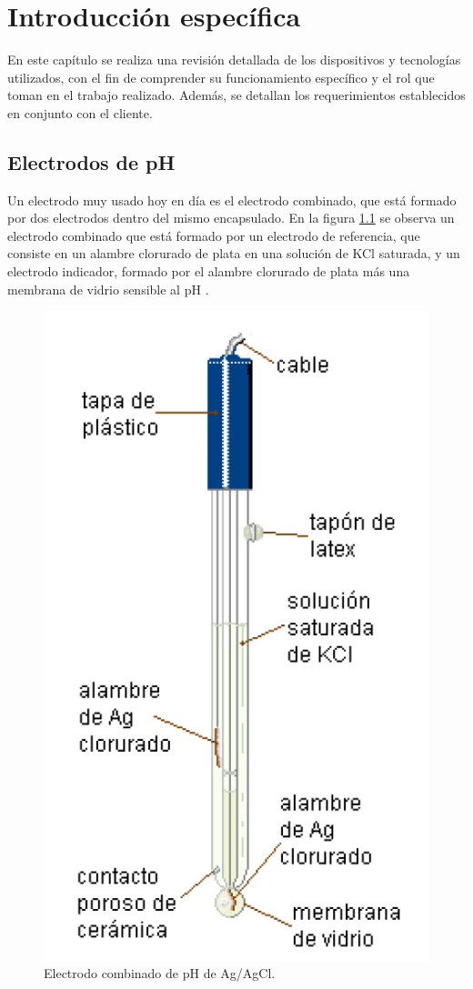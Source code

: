\chapter{Introducción específica} %

\label{Chapter2}

En este capítulo se  realiza una revisión detallada de los dispositivos y tecnologías utilizados, con el fin de comprender su funcionamiento específico y el rol que toman en el trabajo realizado. Además, se detallan los requerimientos establecidos en conjunto con el cliente. 

\section{Electrodos de pH}
\label{sec:electrodoPH}

Un electrodo muy usado hoy en día es el electrodo combinado, que está formado por dos electrodos dentro del mismo encapsulado. En la figura \ref{fig:electrodoCombinado} se observa un electrodo combinado que está formado por un electrodo de referencia, que consiste en un alambre clorurado de plata en una solución de KCl saturada, y un electrodo indicador, formado por el alambre clorurado de plata más una membrana de vidrio sensible al pH \citep{ARTICLE:4}.

\begin{figure}[htbp]
	\centering
	\includegraphics[width=.4\textwidth]{./Figures/electrodoCombinado.png}
	\caption{Electrodo combinado de pH de Ag/AgCl\protect\footnotemark.}
	\label{fig:electrodoCombinado}
\end{figure}

